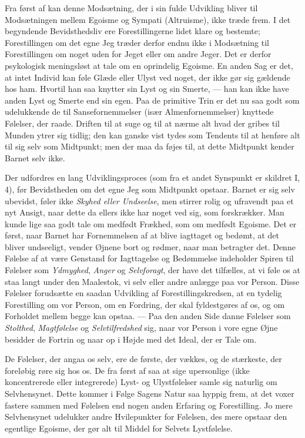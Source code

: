 \documentclass[12pt,a4paper,openany]{book}
\newcommand{\opage}[1]{\marginnote{\footnotesize\textit{[#1]}}}
\begin{document}
Fra først af kan denne Modsætning, der i sin fulde Udvikling bliver til
Modsætningen mellem Egoisme og Sympati (Altruisme), ikke træde frem. I
det begyndende Bevidsthedsliv ere Forestillingerne lidet klare og
bestemte; Forestillingen om det egne Jeg træder derfor endnu ikke i
Modsætning til Forestillingen om noget uden for Jeget eller om andre
Jeger. Det er derfor psykologisk meningsløst at tale om en oprindelig
Egoisme. En anden Sag er det, at intet Individ kan føle Glæde eller
Ulyst ved noget, der ikke gør sig gældende hos
\opage{293}ham. Hvortil han saa knytter sin Lyst og sin Smerte, --- han
kan ikke have anden Lyst og Smerte end sin egen. Paa de primitive Trin
er det nu saa godt som udelukkende de til Sansefornemmelser (især
Almenfornemmelser) knyttede Følelser, der raade. Driften til at suge og
til at nærme alt hvad der gribes til Munden ytrer sig tidlig; den kan
ganske vist tydes som Tendents til at henføre alt til sig selv som
Midtpunkt; men der maa da føjes til, at dette Midtpunkt kender Barnet
selv ikke.

Der udfordres en lang Udviklingsproces (som fra et andet Synspunkt er
skildret I, 4), før Bevidstheden om det egne Jeg som Midtpunkt opstaar.
Barnet er sig selv ubevidst, føler ikke \emph{Skyhed eller Undseelse},
men stirrer rolig og ufravendt paa et nyt Ansigt, naar dette da ellers
ikke har noget ved sig, som forskrækker. Man kunde lige saa godt tale om
medfødt Frækhed, som om medfødt Egoisme. Det er først, naar Barnet har
Fornemmelsen af at blive iagttaget og bedømt, at det bliver undseeligt,
vender Øjnene bort og rødmer, naar man betragter det. Denne Følelse af
at være Genstand for Iagttagelse og Bedømmelse indeholder Spiren til
Følelser som \emph{Ydmyghed}, \emph{Anger} og \emph{Selvforagt}, der
have det tilfælles, at vi føle os at staa langt under den Maalestok, vi
selv eller andre anlægge paa vor Person. Disse Følelser forudsætte en
saadan Udvikling af Forestillingskredsen, at en tydelig Forestilling om
vor Person, om en Fordring, der skal fyldestgøres af os, og om Forholdet
mellem begge kan opstaa. --- Paa den anden Side danne Følelser som
\emph{Stolthed}, \emph{Magtfølelse} og \emph{Selvtilfredshed} sig, naar
vor Person i vore egne Øjne besidder de Fortrin og naar op i Højde med
det Ideal, der er Tale om.

De Følelser, der angaa os selv, ere de første, der vækkes, og de
stærkeste, der foreløbig røre sig hos os. De fra først af saa at sige
upersonlige (ikke koncentrerede eller integrerede) Lyst- og
Ulystfølelser samle sig naturlig om Selvhensynet. Dette kommer i Følge
Sagens Natur saa hyppig frem, at det voxer fastere sammen med Følelsen
end nogen anden Erfaring og Forestilling. Jo mere Selvhensynet udelukker
andre Hvilepunkter for Følelsen, des mere opstaar den egentlige Egoisme,
der gør alt til Middel for Selvets Lystfølelse.
\end{document}
